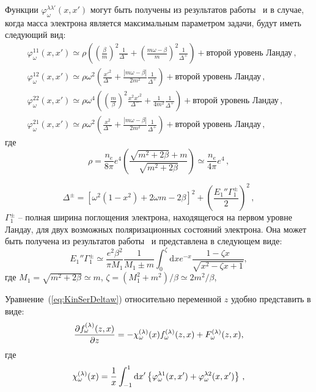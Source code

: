 \documentclass[14pt, russian]{article}
\newcommand{\dd}{\mathrm{d}} %
\begin{document}
Функции $\varphi_\omega^{\lambda\lambda'}(x,x')$ могут быть получены из результатов работы~\cite{Rumyantsev:2017} и в случае, когда масса электрона является максимальным параметром задачи, будут иметь следующий вид:
\begin{equation}\label{eq:Varphi}
	\begin{aligned}
		&\varphi_\omega^{11}(x,x')\simeq \rho \left(\left(\frac{\beta}{m}\right)^2\frac{1}{\Delta^-} +\left(\frac{m \omega -\beta}{m}\right)^2\frac{1}{\Delta^+}\right) + \text{второй уровень Ландау}\, ,
		\\
		&\varphi_\omega^{12}(x,x')\simeq \rho \omega^2 \left(
		\frac{x'^2}{\Delta^-} + \frac{|m\omega - \beta|}{2m^2}\frac{1}{\Delta^+}
		\right)  + \text{второй уровень Ландау}	\, ,
		\\
		&
		\varphi_\omega^{22}(x,x')\simeq \rho \omega^4
		\left(
		\left(\frac{m}{\beta}\right)^2\frac{x^2 x'^2 }{\Delta^-} + \frac{1}{4 m^2}\frac{1}{\Delta^+}
		\right)  + \text{второй уровень Ландау}\, ,
		\\
		&
		\varphi_\omega^{21}(x,x')\simeq \rho \omega^2
		\left(
		\frac{x^2}{\Delta^-} + \frac{|m\omega - \beta|}{2m^2}\frac{1}{\Delta^+}
		\right)  + \text{второй уровень Ландау}\, ,
	\end{aligned}
\end{equation}
где
\begin{equation}
\rho = \frac{n_e}{8\pi} e^4 \left(\frac{\sqrt{m^2+2\beta} + m}{\sqrt{m^2+2\beta}}\right)\simeq \frac{n_e}{4\pi}e^4\, ,
\end{equation}

\begin{equation}
\Delta^\pm = \left[\omega^2(1-x^2)+2 \omega m - 2\beta\right]^2 + \left(\frac{E_1{''} \Gamma^\pm_1}{2}\right)^2 \, ,
\end{equation}
$\Gamma^\pm_1$ -- полная ширина поглощения электрона, находящегося на первом уровне Ландау, для двух возможных поляризационных состояний электрона.  Она может быть получена из результатов работы~\cite{Kuznetsov:2003} и представлена в следующем виде:
\begin{equation}
E_1''\Gamma_1^{\pm} \simeq \frac{e^2\beta^2}{\pi M_1}\frac{1}{M_1\pm m} \int_{0}^{\zeta}\dd x e^{-x} \frac{1-\zeta x}{\sqrt{x^2-\zeta x+1}},
\end{equation}
где $M_1=\sqrt{m^2+2\beta}\simeq m$, $\zeta=(M_1^2+m^2)/\beta\simeq 2m^2/\beta$,

Уравнение~(\ref{eq:KinSerDeltaw}) относительно переменной $z$ удобно представить в виде:
\begin{equation}\label{eq:GenSolve}
	\frac{\partial f^{(\lambda)}_\omega(z,x)}{\partial z} =
	-{\cal \chi}_\omega^{(\lambda)}(x) f^{(\lambda)}_\omega(z,x) + F^{(\lambda)}_\omega(z,x),
\end{equation}
где 
\begin{equation}
	{\cal \chi}_\omega^{(\lambda)}(x) = \frac{1}{x} \int_{-1}^{1} \dd x' \left\{\varphi^{\lambda 1}_\omega(x,x')+\varphi^{\lambda 2}_\omega(x,x')\right\}\, ,
\end{equation}
\end{document}
